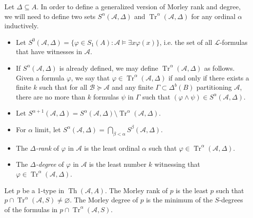 \documentclass{article}
\DeclareMathOperator{\Th}{Th}
\DeclareMathOperator{\Tr}{Tr}
\let\mc\mathcal
\begin{document}
\begin{definition}
    Let $\Delta \subseteq A$. In order to define a generalized version of Morley rank and degree, we will need to define two sets $S^{\alpha}(\mc{A}, \Delta)$ and $\Tr^{\alpha}(\mc{A}, \Delta)$ for any ordinal $\alpha$ inductively.
    \begin{itemize}
        \item Let $S^{0}(\mc{A}, \Delta) = \{ \varphi \in S_1(A) : \mc{A} \vDash \exists x \varphi(x) \}$, i.e. the set of all $\mc{L}$-formulas that have witnesses in $\mc{A}$.

        \item If $S^{\alpha}(\mc{A}, \Delta)$ is already defined, we may define $\Tr^{\alpha}(\mc{A}, \Delta)$ as follows. Given a formula $\varphi$, we say that $\varphi \in \Tr^{\alpha}(\mc{A}, \Delta)$ if and only if there exists a finite $k$ such that for all $\mc{B} \succeq \mc{A}$ and any finite $\Gamma \subset \Delta^{b}(B)$ partitioning $\mc{A}$, there are no more than $k$ formulas $\psi$ in $\Gamma$ such that $(\varphi \land \psi) \in S^{\alpha}(\mc{A}, \Delta)$.
        
        \item Let $S^{\alpha+1}(\mc{A}, \Delta) = S^{\alpha}(\mc{A}, \Delta) \setminus \Tr^{\alpha}(\mc{A}, \Delta)$.

        \item For $\alpha$ limit, let $S^{\alpha}(\mc{A}, \Delta) = \bigcap_{\beta < \alpha} S^{\beta}(\mc{A}, \Delta)$.

        \item The \textit{$\Delta$-rank} of $\varphi$ in $\mc{A}$ is the least ordinal $\alpha$ such that $\varphi \in \Tr^{\alpha}(\mc{A}, \Delta)$.
        
        \item The \textit{$\Delta$-degree} of $\varphi$ in $\mc{A}$ is the least number $k$ witnessing that $\varphi \in \Tr^{\alpha}(\mc{A}, \Delta)$.
    \end{itemize}
\end{definition}

\begin{proposition}\label{dRank}
    Let $p$ be a 1-type in $\Th(\mc{A}, A)$. The Morley rank of $p$ is the least $p$ such that $p \cap \Tr^{\alpha}(\mc{A}, S) \neq \varnothing$. The Morley degree of $p$ is the minimum of the $S$-degrees of the formulas in $p \cap \Tr^{\alpha}(\mc{A}, S)$.
\end{proposition}
\end{document}
